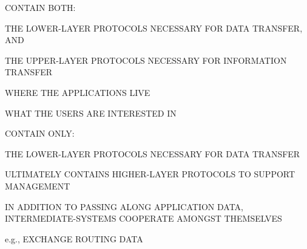 

\begin{bwslide}

\begin{nrtc}
\item	CONTAIN BOTH: 
    \begin{nrtc}
    \item	THE LOWER-LAYER PROTOCOLS NECESSARY FOR DATA TRANSFER, AND

    \item	THE UPPER-LAYER PROTOCOLS NECESSARY FOR INFORMATION TRANSFER
    \end{nrtc}

\item	WHERE THE APPLICATIONS LIVE

\item	WHAT THE USERS ARE INTERESTED IN
\end{nrtc}
\end{bwslide}


\begin{bwslide}

\begin{nrtc}
\item	CONTAIN ONLY:
    \begin{nrtc}
    \item	THE LOWER-LAYER PROTOCOLS NECESSARY FOR DATA TRANSFER
    \end{nrtc}

\item	ULTIMATELY CONTAINS HIGHER-LAYER PROTOCOLS TO SUPPORT MANAGEMENT

\item	IN ADDITION TO PASSING ALONG APPLICATION DATA,
	INTERMEDIATE-SYSTEMS COOPERATE AMONGST THEMSELVES
    \begin{nrtc}
    \item	e.g., EXCHANGE ROUTING DATA
    \end{nrtc}
\end{nrtc}
\end{bwslide}


